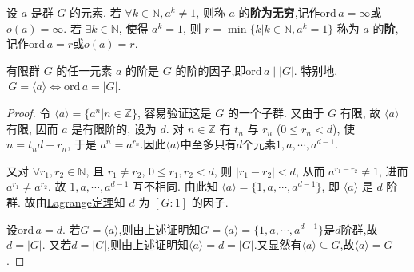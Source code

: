 \documentclass[../../main.tex]{subfiles}%
\begin{document}
\begin{definition}
设 \( a \) 是群 \( G \) 的元素. 若 \( \forall k \in \mathbb{N}, a^k \neq 1 \), 则称 \( a \) 的\textbf{阶为无穷},记作$\mathrm{ord}\,a=\infty $或$o(a)=\infty$. 若 \( \exists k \in \mathbb{N} \), 使得 \( a^k = 1 \), 则 \( r=\min\{k|k \in \mathbb{N}, a^k = 1\} \) 称为 \( a \) 的\textbf{阶},记作$\mathrm{ord}\,a=r$或$o(a)=r$.
\end{definition}

\begin{theorem}\label{theorem:抽象代数-推论 1.3.4}
有限群 \( G \) 的任一元素 \( a \) 的阶是 \( G \) 的阶的因子,即$\text{ord}\,a\mid |G|.$
特别地,$\,G=\langle a \rangle\iff \text{ord}\,a=|G|.$
\end{theorem}
\begin{proof}

令 \( \langle a \rangle = \{a^n|n \in \mathbb{Z}\} \), 容易验证这是 \( G \) 的一个子群. 又由于 \( G \) 有限, 故 \( \langle a \rangle \) 有限, 因而 \( a \) 是有限阶的, 设为 \( d \). 对 \( n \in \mathbb{Z} \) 有 \( t_n \) 与 \( r_n \) (\( 0 \leqslant r_n < d \)), 使 \( n = t_nd + r_n \), 于是 \( a^n = a^{r_n} \).因此$\langle a \rangle$中至多只有$d$个元素$1,a,\cdots,a^{d-1}$.

又对 \( \forall r_1, r_2 \in \mathbb{N} \), 且 \( r_1 \neq r_2 \), \( 0 \leqslant r_1, r_2 < d \), 则 \( |r_1 - r_2| < d \), 从而 \( a^{r_1 - r_2} \neq 1 \), 进而 \( a^{r_1} \neq a^{r_2} \). 故 \( 1, a, \cdots, a^{d-1} \) 互不相同.
由此知 \( \langle a \rangle = \{1, a, \cdots, a^{d-1}\} \), 即 \( \langle a \rangle \) 是 \( d \) 阶群. 故由\hyperref[theorem:抽象代数--Lagrange定理]{Lagrange定理}知 \( d \) 为 \( [G:1] \) 的因子.

设$\text{ord}\,a=d$.
若$G=\langle a \rangle$,则由上述证明知$G=\langle a \rangle = \{1, a, \cdots, a^{d-1}\}$是$d$阶群,故$d=|G|.$
又若$d=|G|$,则由上述证明知$\langle a \rangle=d=|G|$.又显然有$\langle a \rangle\subseteq G$,故$\langle a \rangle = G$.

\end{proof}
\end{document}
